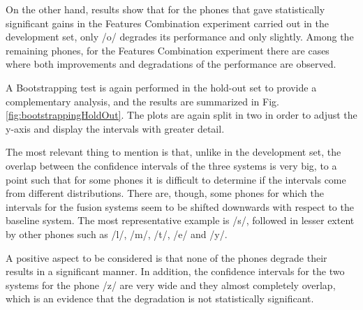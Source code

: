 On the other hand, results show that
for the phones that gave statistically significant gains in the
Features Combination experiment carried out in the development set, only /o/ degrades
its performance and only slightly.
Among the remaining phones, for the Features Combination experiment
there are cases where both improvements
and degradations of the performance are observed.

A Bootstrapping test is again performed in the hold-out set to provide a complementary analysis,
and the results are summarized in Fig. \ref{fig:bootstrappingHoldOut}.
The plots are again split in two in order to adjust the y-axis and display the intervals
with greater detail.

The most relevant thing to mention is that, unlike in the development set, the overlap
between the confidence intervals of the three systems is very big, to a point such that
for some phones it is difficult to determine if the intervals come from different
distributions. There are, though, some phones for which the intervals
for the fusion systems seem to be
shifted downwards with respect to the baseline system. The most representative example
is /s/, followed in lesser extent by other phones such as /l/, /m/, /t/, /e/ and /y/.

A positive aspect to be considered is that none of the phones degrade their
results in a significant manner. In addition,
the confidence intervals
for the two systems for the phone /z/ are very wide and they almost completely overlap,
which is an evidence that the degradation is not statistically significant.



